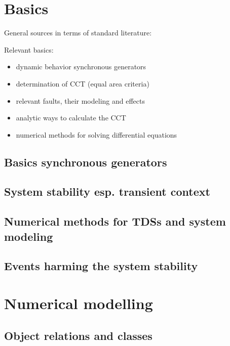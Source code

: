 
\chapter{Basics}
\label{chap:sota}

General sources in terms of standard literature: \autocite{oedingElektrischeKraftwerkeUnd2016,gloverPowerSystemAnalysis2017,kundurPowerSystemStability2022,machowskiPowerSystemDynamics2020}

Relevant basics:
\begin{itemize}
        \item dynamic behavior synchronous generators
        \item determination of \acs{CCT} (equal area criteria)
        \item relevant faults, their modeling and effects
        \item analytic ways to calculate the \acs{CCT}
        \item numerical methods for solving differential equations
\end{itemize}

\section{Basics synchronous generators}

\section{System stability esp. transient context}

\section{Numerical methods for TDSs and system modeling}

\section{Events harming the system stability}

\chapter{Numerical modelling}
\label{chap:methods}

\section{Object relations and classes}

